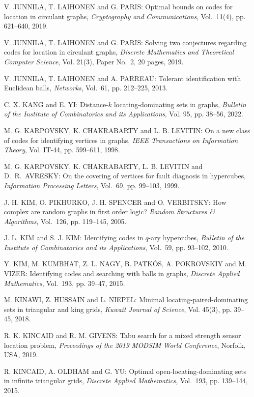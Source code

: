 \begin{thebibliography}{999}
V. JUNNILA, T. LAIHONEN and G. PARIS: Optimal bounds on codes for location in circulant graphs, {\it Cryptography and Communications}, Vol.~11(4), pp. 621--640, 2019.

V. JUNNILA, T. LAIHONEN and G. PARIS: Solving two conjectures regarding codes for location in circulant graphs, {\it Discrete Mathematics and Theoretical Computer Science}, Vol. 21(3), Paper No.~2, 20 pages, 2019.

V. JUNNILA, T. LAIHONEN and A. PARREAU: Tolerant identification with Euclidean balls, {\it Networks}, Vol.~61, pp. 212--225, 2013.

C. X. KANG and E. YI: Distance-$k$ locating-dominating sets in graphs, {\it Bulletin of the Institute of Combinatorics and its Applications}, Vol. 95, pp. 38--56, 2022.

M. G. KARPOVSKY, K. CHAKRABARTY and L. B. LEVITIN: On a new class of codes for identifying vertices in graphs, {\it IEEE Transactions on Information Theory}, Vol. IT-44, pp. 599--611, 1998.

M. G. KARPOVSKY, K. CHAKRABARTY, L. B. LEVITIN and D.~R.~AVRESKY: On the covering of vertices for fault diagnosis in hypercubes, {\it Information Processing Letters}, Vol.~69, pp. 99--103, 1999.

J. H. KIM, O. PIKHURKO, J. H. SPENCER and O. VERBITSKY: How complex are random graphs in first order logic? {\it Random Structures \& Algorithms}, Vol.~126, pp. 119--145, 2005.

J. L. KIM and S. J. KIM: Identifying codes in $q$-ary hypercubes, {\it Bulletin of the Institute of Combinatorics and its Applications}, Vol.~59, pp. 93--102, 2010.

Y. KIM, M. KUMBHAT, Z. L. NAGY, B. PATK\'OS, A. POKROVSKIY and M. VIZER: Identifying codes and searching with balls in graphs, {\it Discrete Applied Mathematics}, Vol.~193, pp. 39--47, 2015.

M. KINAWI, Z. HUSSAIN and L. NIEPEL: Minimal locating-paired-dominating sets in triangular and king grids, {\it Kuwait Journal of Science}, Vol. 45(3), pp. 39--45, 2018.

R. K. KINCAID and R. M. GIVENS: Tabu search for a mixed strength sensor location problem, {\it Proceedings of the 2019 MODSIM World Conference}, Norfolk, USA, 2019.

R. KINCAID, A. OLDHAM and G. YU: Optimal open-locating-dominating sets in infinite triangular grids, {\it Discrete Applied Mathematics}, Vol.~193, pp. 139--144, 2015.


\end{thebibliography}
